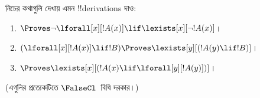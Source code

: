 \documentclass[../../../include/open-logic-section]{subfiles}
\begin{document}
\begin{prob}
নিচের কথাগুলি দেখায় এমন !!{derivation}s দাও:
\begin{enumerate}
\item $\Proves \lnot\lforall[x][!A(x)] \lif \lexists[x][\lnot!A(x)]$।
\item $(\lforall[x][!A(x)] \lif !B) \Proves \lexists[y][(!A(y) \lif !B)]$।
\item $\Proves \lexists[x][(!A(x) \lif \lforall[y][!A(y)])]$।
\end{enumerate}
(এগুলির প্রত্যেকটিতে $\FalseCl$~বিধি দরকার।)
\end{prob}
\end{document}
